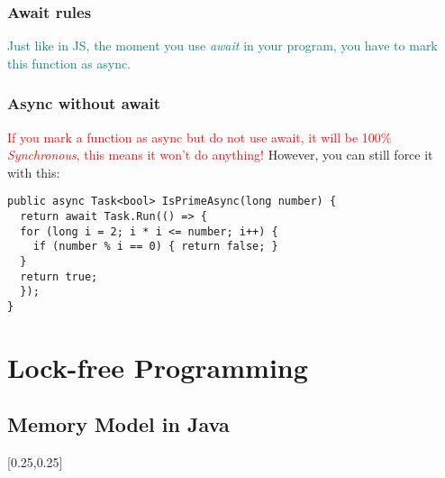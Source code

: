 \documentclass[main.tex,fontsize=8pt,paper=a4,paper=portrait,DIV=calc,]{scrartcl}
\begin{document}
\subsubsection{Await rules}
\textcolor{teal}{Just like in JS, the moment you use \emph{await} in your program, you have to mark this function as async.}\newline

\subsubsection{Async without await}
\textcolor{red}{If you mark a function as async but do not use await, it will be 100\% \emph{Synchronous}, this means it won't do anything!}\newline
However, you can still force it with this: 
\begin{lstlisting}
public async Task<bool> IsPrimeAsync(long number) {
  return await Task.Run(() => {
  for (long i = 2; i * i <= number; i++) {
    if (number % i == 0) { return false; }
  }
  return true;
  });
}
\end{lstlisting}

\section{Lock-free Programming}

\subsection{Memory Model in Java}
[0.25,0.25]
\end{document}
